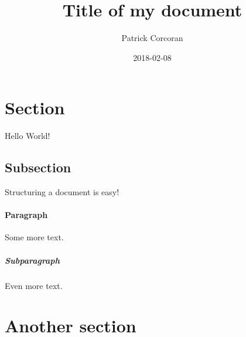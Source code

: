 \documentclass{article}
\title{Title of my document}
\date{2018-02-08}
\author{Patrick Corcoran}
\begin{document}
 \maketitle
 \newpage

 \section{Section}
  Hello World!

 \subsection{Subsection}
  Structuring a document is easy!

 \paragraph{Paragraph}
  Some more text.

 \subparagraph{Subparagraph}
  Even more text.

 \section{Another section}
\end{document}
